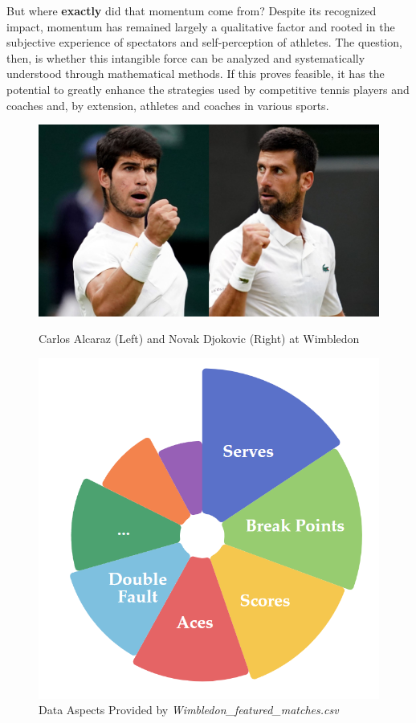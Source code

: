 \documentclass[12pt]{article}  %
\begin{document}
But where \textbf{exactly} did that momentum come from? Despite its recognized impact, momentum has remained largely a qualitative factor and rooted in the subjective experience of spectators and self-perception of athletes. The question, then, is whether this intangible force can be analyzed and systematically understood through mathematical methods. If this proves feasible, it has the potential to greatly enhance the strategies used by competitive tennis players and coaches and, by extension, athletes and coaches in various sports.

\begin{figure}[htbp]
	\centering
	\begin{minipage}{0.5\textwidth}
	\centering  %
\includegraphics[width=.95\textwidth]{carlos-alcaraz.jpg} %
\caption{Carlos Alcaraz (Left) and Novak Djokovic (Right) at Wimbledon \cite{1}} %
\label{fig:Fire Situation} %
	\end{minipage}\hfill
	\begin{minipage}{0.45\textwidth}
	\centering  %
\includegraphics[width=.6\textwidth]{data-given.png} %
\caption{Data Aspects Provided by \textit{Wimbledon\_featured\_matches.csv}} %
\label{fig:Fire Situation} %
	\end{minipage}
\end{figure}
\end{document}
